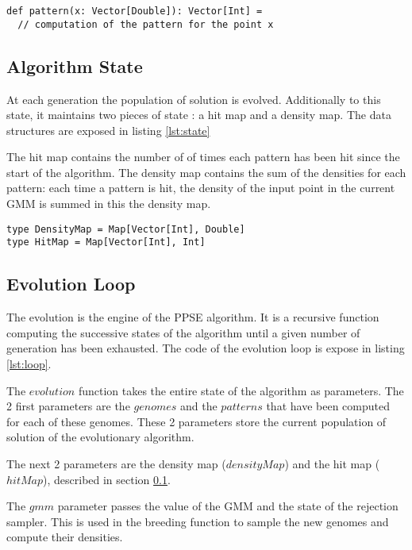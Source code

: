 \documentclass[10pt,a4paper]{article}
\theoremstyle{definition}
\theoremstyle{remark}
\begin{document}
\begin{lstlisting}[caption={Pattern function},label={lst:pattern}]
def pattern(x: Vector[Double]): Vector[Int] = 
  // computation of the pattern for the point x
\end{lstlisting}


\subsection{Algorithm State}\label{sec. algoState}

At each generation the population of solution is evolved. Additionally to this state, it maintains two pieces of state : a hit map and a density map. The data structures are exposed in listing \ref{lst:state}

The hit map contains the number of of times each pattern has been hit since the start of the algorithm. The density map contains the sum of the densities for each pattern: each time a pattern is hit, the density of the input point in the current GMM is summed in this the density map. 

\begin{lstlisting}[caption={State},label={lst:state}]
type DensityMap = Map[Vector[Int], Double]
type HitMap = Map[Vector[Int], Int]
\end{lstlisting}


\subsection{Evolution Loop}

The evolution is the engine of the PPSE algorithm. It is a recursive function computing the successive states of the algorithm until a given number of generation has been exhausted. The code of the evolution loop is expose in listing \ref{lst:loop}.

The $evolution$ function takes the entire state of the algorithm as parameters. The 2 first parameters are the $genomes$ and the $patterns$ that have been computed for each of these genomes. These 2 parameters store the current population of solution of the evolutionary algorithm.

The next 2 parameters are the density map ($densityMap$) and the hit map ($hitMap$), described in section \ref{sec. algoState}.

The $gmm$ parameter passes the value of the GMM and the state of the rejection sampler. This is used in the breeding function to sample the new genomes and compute their densities.
\end{document}
